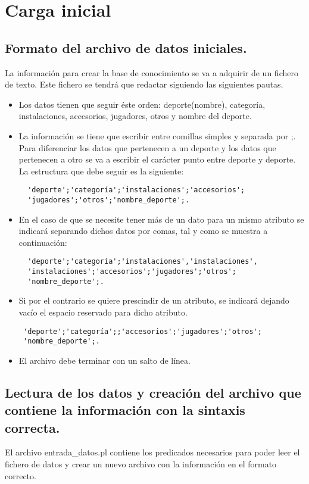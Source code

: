 \chapter{Carga inicial}

\section{Formato del archivo de datos iniciales.}
\label{sec:formato}

La información para crear la base de conocimiento se va a adquirir de un fichero de texto. Este fichero se tendrá que redactar siguiendo las siguientes pautas.
\begin{itemize}
 \item Los datos tienen que seguir éste orden: deporte(nombre), categoría, instalaciones, accesorios, jugadores, otros y nombre del deporte.
 \item La información se tiene que escribir entre comillas simples y separada por ;. Para diferenciar los datos que pertenecen a un deporte y los datos que pertenecen a otro se va a escribir el carácter punto entre deporte y deporte. La estructura que debe seguir es la siguiente:

\begin{verbatim}
  'deporte';'categoría';'instalaciones';'accesorios';
  'jugadores';'otros';'nombre_deporte';.
\end{verbatim}

 \item En el caso de que se necesite tener más de un dato para un mismo atributo se indicará separando dichos datos por comas, tal y como se muestra a continuación:
\begin{verbatim}
  'deporte';'categoría';'instalaciones','instalaciones',
  'instalaciones';'accesorios';'jugadores';'otros';
  'nombre_deporte';.
\end{verbatim}
 
\item Si por el contrario se quiere prescindir de un atributo, se indicará dejando vacío el espacio reservado para dicho atributo.
\begin{verbatim}
 'deporte';'categoría';;'accesorios';'jugadores';'otros';
 'nombre_deporte';.
\end{verbatim}

 \item El archivo debe terminar con un salto de línea.
\end{itemize}

\section{Lectura de los datos y creación del archivo que contiene la información con la sintaxis correcta.}
El archivo entrada\_datos.pl contiene los predicados necesarios para poder leer el fichero de datos y crear un nuevo archivo con la información en el formato correcto.\\ 

